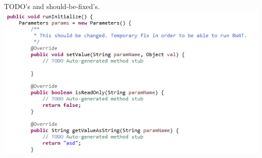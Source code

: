 \documentclass[11pt,a4paper]{article}
\begin{document}
TODO's and should-be-fixed's.\\
\includegraphics[width=\linewidth]{TODOs+shouldBeFixed.PNG} \\
\end{document}
